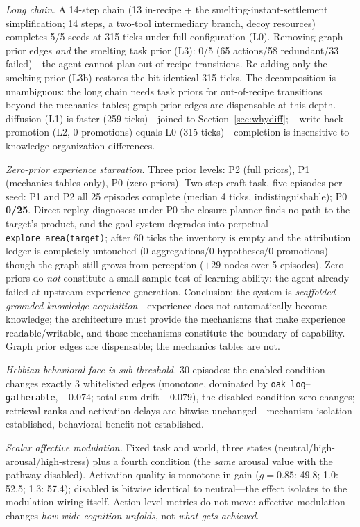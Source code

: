 \documentclass[10pt,a4paper]{article}
\begin{document}
\emph{Long chain.} A 14-step chain (13 in-recipe + the smelting-instant-settlement simplification; 14 steps, a two-tool intermediary branch, decoy resources) completes 5/5 seeds at 315 ticks under full configuration (L0). Removing graph prior edges \emph{and} the smelting task prior (L3): 0/5 (65 actions/58 redundant/33 failed)---the agent cannot plan out-of-recipe transitions. Re-adding only the smelting prior (L3b) restores the bit-identical 315 ticks. The decomposition is unambiguous: the long chain needs task priors for out-of-recipe transitions beyond the mechanics tables; graph prior edges are dispensable at this depth. $-$diffusion (L1) is faster (259 ticks)---joined to Section~\ref{sec:whydiff}; $-$write-back promotion (L2, 0 promotions) equals L0 (315 ticks)---completion is insensitive to knowledge-organization differences.

\emph{Zero-prior experience starvation.} Three prior levels: P2 (full priors), P1 (mechanics tables only), P0 (zero priors). Two-step craft task, five episodes per seed: P1 and P2 all 25 episodes complete (median 4 ticks, indistinguishable); P0 \textbf{0/25}. Direct replay diagnoses: under P0 the closure planner finds no path to the target's product, and the goal system degrades into perpetual \texttt{explore\_area(target)}; after 60 ticks the inventory is empty and the attribution ledger is completely untouched (0 aggregations/0 hypotheses/0 promotions)---though the graph still grows from perception ($+29$ nodes over 5 episodes). Zero priors do \emph{not} constitute a small-sample test of learning ability: the agent already failed at upstream experience generation. Conclusion: the system is \emph{scaffolded grounded knowledge acquisition}---experience does not automatically become knowledge; the architecture must provide the mechanisms that make experience readable/writable, and those mechanisms constitute the boundary of capability. Graph prior edges are dispensable; the mechanics tables are not.

\emph{Hebbian behavioral face is sub-threshold.} 30 episodes: the enabled condition changes exactly 3 whitelisted edges (monotone, dominated by \texttt{oak\_log}--\texttt{gatherable}, $+0.074$; total-sum drift $+0.079$), the disabled condition zero changes; retrieval ranks and activation delays are bitwise unchanged---mechanism isolation established, behavioral benefit not established.

\emph{Scalar affective modulation.} Fixed task and world, three states (neutral/high-arousal/high-stress) plus a fourth condition (the \emph{same} arousal value with the pathway disabled). Activation quality is monotone in gain ($g{=}0.85$: 49.8; 1.0: 52.5; 1.3: 57.4); disabled is bitwise identical to neutral---the effect isolates to the modulation wiring itself. Action-level metrics do not move: affective modulation changes \emph{how wide cognition unfolds}, not \emph{what gets achieved}.
\end{document}
